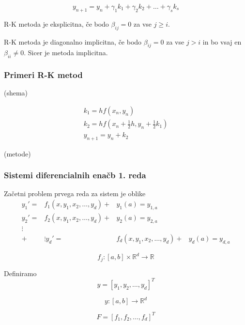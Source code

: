 \documentclass[a4paper,12pt]{article}
\theoremstyle{definition}
\theoremstyle{remark}
\newcommand{\R}{\mathbb{R}}
\newcounter{subsubsubsection}[subsubsection]
\begin{document}
\begin{equation*}
    y_{n+1} = y_n + \gamma_1 k_1 + \gamma_2 k_2 + \dots + \gamma_s k_s
\end{equation*}

R-K metoda je eksplicitna, če bodo $\beta_{ij} = 0$ za vse $j \geq i$.

R-K metoda je diagonalno implicitna, če bodo $\beta_{ij} = 0$ za vse $j > i$ in bo vsaj en $\beta_{ii} \neq 0$. Sicer je metoda implicitna.

\subsubsection{Primeri R-K metod}
 (shema)

\begin{gather*}
    k_1 = h f(x_n, y_n) \\
    k_2 = h f(x_n + \frac{1}{2} h, y_n + \frac{1}{2}k_1) \\
    y_{n+1} = y_n + k_2
\end{gather*}

(metode)

\subsubsection*{Sistemi diferencialnih enačb 1. reda}
Začetni problem prvega reda za sistem je oblike
\begin{align*}
    y_1' =& f_1(x, y_1, x_2, \dots, y_d) +& y_1(a) = y_{1, a} \\
    y_2' =& f_2(x, y_1, x_2, \dots, y_d) +& y_2(a) = y_{2, a} \\
    \vdots& \\ +& \vdots
    y_d' =& f_d(x, y_1, x_2, \dots, y_d) +& y_d(a) = y_{d, a}
\end{align*}

\begin{equation*}
    f_j: [a, b] \times \R^d \to \R
\end{equation*}

Definiramo
\begin{equation*}
    y = [y_1, y_2, \dots, y_d]^T
\end{equation*}

\begin{equation*}
    y: [a, b] \to \R^d
\end{equation*}

\begin{equation*}
    F = [f_1, f_2, \dots, f_d]^T
\end{equation*}
\end{document}
